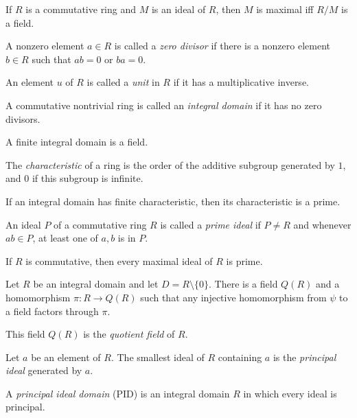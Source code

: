 \begin{prop}
    If $R$ is a commutative ring and $M$ is an ideal of $R$, then
    $M$ is maximal iff $R/M$ is a field.
\end{prop}
\begin{defn}
    A nonzero element $a\in R$ is called a \emph{zero
    divisor} if there is a nonzero element $b\in R$ such that $ab=0$ or $ba=0$.
\end{defn}
\begin{defn}
    An element $u$ of $R$ is called a \emph{unit}
    in $R$ if it has a multiplicative inverse.
\end{defn}
\begin{defn}
    A commutative nontrivial ring is called an \emph{integral domain} if it has
    no zero divisors.
\end{defn}
\begin{prop}
    A finite integral domain is a field.
\end{prop}
\begin{defn}
    The \emph{characteristic} of a ring is the order of the additive
    subgroup generated by $1$, and $0$ if this subgroup is infinite.
\end{defn}
\begin{prop}
    If an integral domain has finite characteristic, then its characteristic is
    a prime.
\end{prop}
\begin{defn}
    An ideal $P$ of a commutative ring $R$ is called a \emph{prime ideal} if
    $P\ne R$ and whenever $ab\in P$, at least one of $a,b$ is in $P$.
\end{defn}
\begin{prop}
    If $R$ is commutative, then every maximal ideal of $R$ is prime.
\end{prop}
\begin{prop}
    Let $R$ be an integral domain and let $D=R\setminus\{0\}$. 
    There is a field $Q(R)$ and a homomorphism $\pi:R\to Q(R)$
    such that any injective homomorphism from $\psi$ to a field factors through
    $\pi$.
\end{prop}
\begin{defn}
    This field $Q(R)$ is the \emph{quotient field} of $R$.
\end{defn}
\begin{defn}
    Let $a$ be an element of $R$. The smallest ideal of $R$ containing $a$ is
    the \emph{principal ideal} generated by $a$.
\end{defn}
\begin{defn}
    A \emph{principal ideal domain} (PID) is an integral domain $R$ in which every ideal
    is principal.
\end{defn}
